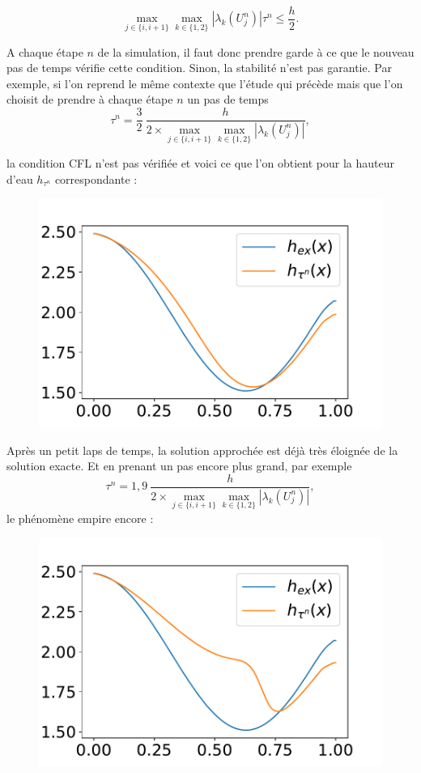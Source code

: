 \documentclass[
11pt, %
francais, %
singlespacing, %
headsepline, %
f%
]{MastersDoctoralThesis} %
\theoremstyle{definition}
\begin{document}
$$
\underset{j\in \{i,i+1\}}{\max} \underset{k\in\{1,2\}}{\max} |\lambda_{k}(U_{j}^{n}) | \tau^{n} \leq \frac{h}{2}.
$$

A chaque étape $n$ de la simulation, il faut donc prendre garde à ce que le nouveau pas de temps vérifie cette condition. Sinon, la stabilité n'est pas garantie. Par exemple, si l'on reprend le même contexte que l'étude qui précède mais que l'on choisit de prendre à chaque étape $n$ un pas de temps $$\tau^{n}=\frac{3}{2}~\frac{h}{2\times\underset{j\in \{i,i+1\}}{\max} \underset{k\in\{1,2\}}{\max} |\lambda_{k}(U_{j}^{n}) |},$$

la condition CFL n'est pas vérifiée et voici ce que l'on obtient pour la hauteur d'eau $h_{\tau^{n}}$ correspondante :

\begin{figure}
\centering
\includegraphics[scale = .8]{CFL1}
\end{figure}

Après un petit laps de temps, la solution approchée est déjà très éloignée de la solution exacte. Et en prenant un pas encore plus grand, par exemple $$\tau^{n}=1,9~\frac{h}{2\times\underset{j\in \{i,i+1\}}{\max} \underset{k\in\{1,2\}}{\max} |\lambda_{k}(U_{j}^{n}) |},$$ le phénomène empire encore :

\begin{figure}
\centering
\includegraphics[scale = .8]{CFL2}
\end{figure}
\end{document}
